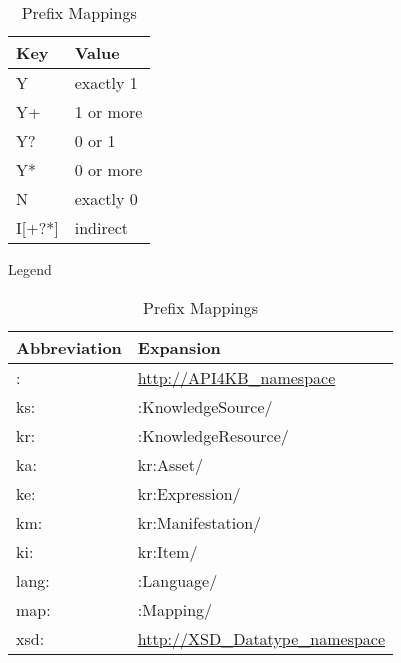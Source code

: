 \documentclass[runningheads]{llncs}
\begin{document}
\begin{table}[h]
\begin{minipage}[b]{0.45\linewidth}
\centering
\begin{tabular}{|l|l|}
\hline
\textbf{Key} & \textbf{Value} \\ \hline
Y            & exactly 1      \\ \hline
Y+           & 1 or more      \\ \hline
Y?           & 0 or 1         \\ \hline
Y*           & 0 or more      \\ \hline
N            & exactly 0      \\ \hline
I[+?*]       & indirect      \\ \hline
\end{tabular}
\caption{Legend}
\label{legend}
\end{minipage}
\hspace{0.5cm}
\begin{minipage}[b]{0.45\linewidth}
\centering
\begin{tabular}{|l|l|}
\hline
\textbf{Abbreviation} & \textbf{Expansion} \\ \hline
:            & \url{http://API4KB_namespace}      \\ \hline
ks:            & :KnowledgeSource/      \\ \hline
kr:            & :KnowledgeResource/      \\ \hline
ka:            & kr:Asset/      \\ \hline
ke:            & kr:Expression/      \\ \hline
km:            & kr:Manifestation/      \\ \hline
ki:            & kr:Item/      \\ \hline
lang:            & :Language/      \\ \hline
map:            & :Mapping/      \\ \hline
xsd:            & \url{http://XSD_Datatype_namespace }     \\ \hline
\end{tabular}
\caption{Prefix Mappings}
\label{abbreviations}
\end{minipage}
\end{table}
\end{document}
